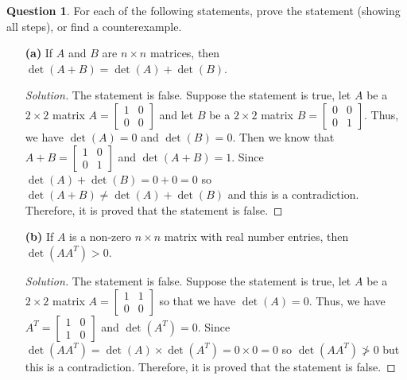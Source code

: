 \documentclass{article}
\theoremstyle{definition}
\newtheorem{question}{Question}
\begin{document}
\begin{question} For each of the following statements, prove the statement (showing all steps), or find a counterexample.

\vspace{.25cm}

\begin{enumerate}

\item[{\bf (a)}] If $A$ and $B$ are $n\times n$ matrices, then $\det(A+B) = \det(A) + \det(B)$.

\begin{proof}[Solution]
    The statement is false. Suppose the statement is true, let \(A\) be a \(2\times2\) matrix \(A=
    \begin{bmatrix}
        1 & 0 \\
        0 & 0
    \end{bmatrix}\) and let \(B\) be a \(2\times2\) matrix \(B=
    \begin{bmatrix}
        0 & 0 \\
        0 & 1
    \end{bmatrix}\). Thus, we have \(\det(A)=0\) and \(\det(B)=0\).
    Then we know that \(A+B=
    \begin{bmatrix}
        1 & 0 \\
        0 & 1
    \end{bmatrix}\) and \(\det(A+B)=1\). Since \(\det(A)+\det(B)=0+0=0\) so \(\det(A+B)\neq\det(A)+\det(B)\)
    and this is a contradiction. Therefore, it is proved that the statement is false.
\end{proof}

\vspace{.25cm}

\item[{\bf (b)}] If $A$ is a non-zero $n\times n$ matrix with real number entries, then $\det(AA^T) > 0$.

\begin{proof}[Solution]
    The statement is false. Suppose the statement is true, let \(A\) be a \(2\times2\) matrix \(A=
    \begin{bmatrix}
        1 & 1 \\
        0 & 0
    \end{bmatrix}\) so that we have \(\det(A)=0\). Thus, we have \(A^T=
    \begin{bmatrix}
        1 & 0 \\
        1 & 0
    \end{bmatrix}\) and \(\det(A^T)=0\). Since \(\det(AA^T)=\det(A)\times\det(A^T)=0\times0=0\) so \(\det(AA^T)\ngtr0\) but this is a contradiction.
    Therefore, it is proved that the statement is false.
\end{proof}


\end{enumerate}
\end{question}
\end{document}
